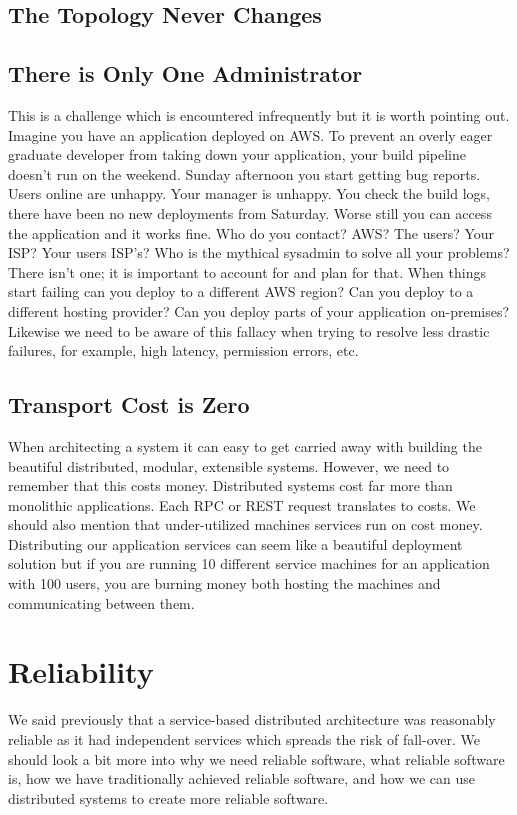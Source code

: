 \subsection{The Topology Never Changes}

\subsection{There is Only One Administrator}
This is a challenge which is encountered infrequently but it is worth pointing out.
Imagine you have an application deployed on AWS.
To prevent an overly eager graduate developer from taking down your application,
your build pipeline doesn't run on the weekend.
Sunday afternoon you start getting bug reports.
Users online are unhappy.
Your manager is unhappy.
You check the build logs,
there have been no new deployments from Saturday.
Worse still you can access the application and it works fine.
Who do you contact?
AWS? The users? Your ISP? Your users ISP's?
Who is the mythical sysadmin to solve all your problems?
There isn't one; it is important to account for and plan for that.
When things start failing can you deploy to a different AWS region?
Can you deploy to a different hosting provider?
Can you deploy parts of your application on-premises?
Likewise we need to be aware of this fallacy when trying to resolve less drastic failures, for example, high latency, permission errors, etc.

\subsection{Transport Cost is Zero}
When architecting a system it can easy to get carried away with building the beautiful distributed, modular, extensible systems.
However, we need to remember that this costs money.
Distributed systems cost far more than monolithic applications.
Each RPC or REST request translates to costs.
We should also mention that under-utilized machines services run on cost money.
Distributing our application services can seem like a beautiful deployment solution but if you are running 10 different service machines for an application with 100 users,
you are burning money both hosting the machines and communicating between them. 

\section{Reliability}
We said previously that a service-based distributed architecture was reasonably reliable as it had independent services which spreads the risk of fall-over.
We should look a bit more into why we need reliable software,
what reliable software is,
how we have traditionally achieved reliable software,
and how we can use distributed systems to create more reliable software.

